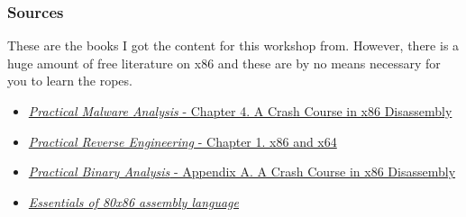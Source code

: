 \documentclass{beamer}
\begin{document}
	\begin{frame}
		\frametitle{Sources}
		
		These are the books I got the content for this workshop from. However, there is a huge amount of free literature on x86 and these are by no means necessary for you to learn the ropes. 
		\newline		
		
		\begin{itemize}
			\item \href{https://www.worldcat.org/search?q=bn:9781593274306}{\textit{Practical Malware Analysis} - Chapter 4. A Crash Course in x86 Disassembly}
			\item \href{https://www.worldcat.org/search?q=bn:9781593274306}{\textit{Practical Reverse Engineering} - Chapter 1. x86 and x64}
			\item \href{https://www.wiley.com/en-gb/Practical+Reverse+Engineering:+x86,+x64,+ARM,+Windows+Kernel,+Reversing+Tools,+and+Obfuscation-p-9781118787311}{\textit{Practical Binary Analysis} - Appendix A. A Crash Course in x86 Disassembly}
			\item \href{https://eleanor.lib.gla.ac.uk/record=b2470109}{\textit{Essentials of 80x86 assembly language}}
		\end{itemize}		
	\end{frame}
	
	
\end{document}

